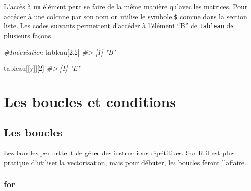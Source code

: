 \documentclass[
]{book}
\newenvironment{Shaded}{\begin{snugshade}}{\end{snugshade}}
\newcommand{\CommentTok}[1]{\textcolor[rgb]{0.56,0.35,0.01}{\textit{#1}}}
\newcommand{\DecValTok}[1]{\textcolor[rgb]{0.00,0.00,0.81}{#1}}
\newcommand{\NormalTok}[1]{#1}
\newcommand{\SpecialCharTok}[1]{\textcolor[rgb]{0.00,0.00,0.00}{#1}}
\newcommand{\StringTok}[1]{\textcolor[rgb]{0.31,0.60,0.02}{#1}}
\theoremstyle{definition}
\theoremstyle{definition}
\theoremstyle{definition}
\theoremstyle{definition}
\theoremstyle{remark}
\begin{document}
L'accès à un élément peut se faire de la même manière qu'avec les matrices. Pour accéder à une colonne par son nom on utilise le symbole \texttt{\$} comme dans la section liste. Les codes suivants permettent d'accéder à l'élément ``B'' de \texttt{tableau} de plusieurs façons.

\begin{Shaded}
\begin{Highlighting}[]
\CommentTok{\#Indexiation}
\NormalTok{tableau[}\DecValTok{2}\NormalTok{,}\DecValTok{2}\NormalTok{]}
\CommentTok{\#\textgreater{} [1] "B"}
\end{Highlighting}
\end{Shaded}

\begin{Shaded}
\end{Shaded}

\begin{Shaded}
\begin{Highlighting}[]
\NormalTok{tableau[[}\StringTok{\textquotesingle{}y\textquotesingle{}}\NormalTok{]][}\DecValTok{2}\NormalTok{]}
\CommentTok{\#\textgreater{} [1] "B"}
\end{Highlighting}
\end{Shaded}

\hypertarget{les-boucles-et-conditions}{%
\section{Les boucles et conditions}\label{les-boucles-et-conditions}}

\hypertarget{les-boucles}{%
\subsection{Les boucles}\label{les-boucles}}

Les boucles permettent de gérer des instructions répétitives. Sur R il est plus pratique d'utiliser la vectorisation, mais pour débuter, les boucles feront l'affaire.

\hypertarget{for}{%
\subsubsection*{for}\label{for}}
\end{document}
